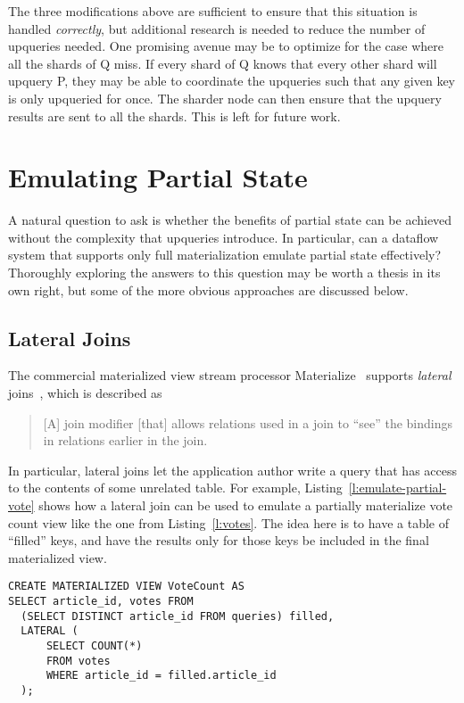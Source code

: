 The three modifications above are sufficient to ensure that this situation is
handled \emph{correctly}, but additional research is needed to reduce the number
of upqueries needed. One promising avenue may be to optimize for the case where
all the shards of Q miss. If every shard of Q knows that every other shard will
upquery P, they may be able to coordinate the upqueries such that any given key
is only upqueried for once. The sharder node can then ensure that the upquery
results are sent to all the shards. This is left for future work.

\section{Emulating Partial State}

A natural question to ask is whether the benefits of partial state can be
achieved without the complexity that upqueries introduce. In particular, can a
dataflow system that supports only full materialization emulate partial state
effectively? Thoroughly exploring the answers to this question may be worth a
thesis in its own right, but some of the more obvious approaches are discussed
below.

\subsection{Lateral Joins}

The commercial materialized view stream processor Materialize~\cite{materialize}
supports \emph{lateral} joins~\cite{lateral-join}, which is described as

\begin{quote}
  [A] join modifier [that] allows relations used in a join to ``see'' the
  bindings in relations earlier in the join.
\end{quote}

In particular, lateral joins let the application author write a query that has
access to the contents of some unrelated table. For example,
Listing~\vref{l:emulate-partial-vote} shows how a lateral join can be used to
emulate a partially materialize vote count view like the one from
Listing~\vref{l:votes}. The idea here is to have a table of ``filled'' keys, and
have the results only for those keys be included in the final materialized view.

\begin{listing}[h]
  \begin{verbatim}
CREATE MATERIALIZED VIEW VoteCount AS
SELECT article_id, votes FROM
  (SELECT DISTINCT article_id FROM queries) filled,
  LATERAL (
      SELECT COUNT(*)
      FROM votes
      WHERE article_id = filled.article_id
  );
  \end{verbatim}
  \caption{Using a lateral join to emulate partial state in vote.}
  \label{l:emulate-partial-vote}
\end{listing}

